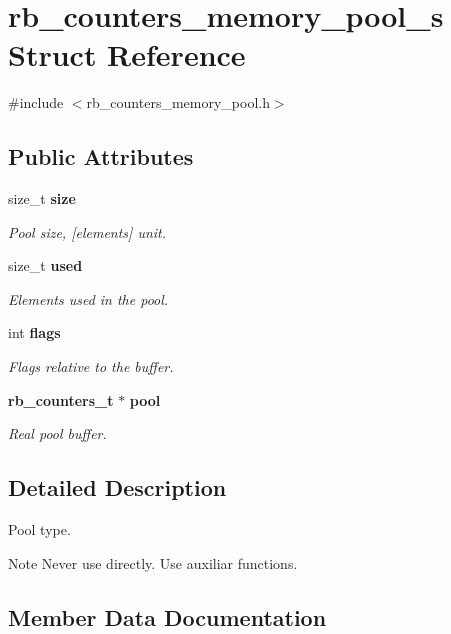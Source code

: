 \section{rb\_counters\_memory\_pool\_s Struct Reference}
\label{structrb__counters__memory__pool__s}


{\ttfamily \#include $<$rb\_counters\_memory\_pool.\+h$>$}

\subsection*{Public Attributes}
\begin{DoxyCompactItemize}
\item 
size\_t {\bf size}
\begin{DoxyCompactList}\small\item\em Pool size, [elements] unit. \end{DoxyCompactList}\item 
size\_t {\bf used}
\begin{DoxyCompactList}\small\item\em Elements used in the pool. \end{DoxyCompactList}\item 
int {\bf flags}
\begin{DoxyCompactList}\small\item\em Flags relative to the buffer. \end{DoxyCompactList}\item 
{\bf rb\_counters\_t} $\ast$ {\bf pool}
\begin{DoxyCompactList}\small\item\em Real pool buffer. \end{DoxyCompactList}\end{DoxyCompactItemize}


\subsection{Detailed Description}
Pool type. \begin{DoxyNote}{Note}
Never use directly. Use auxiliar functions. 
\end{DoxyNote}


\subsection{Member Data Documentation}
